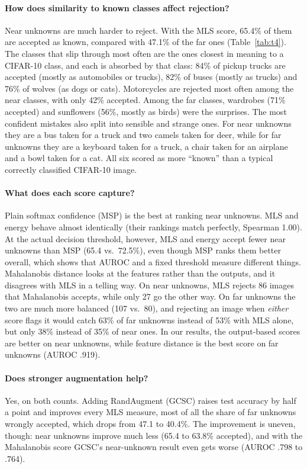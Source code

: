 \documentclass{article}
\begin{document}
\paragraph{How does similarity to known classes affect rejection?} Near unknowns are much harder to reject. With the MLS score, 65.4\% of them are accepted as known, compared with 47.1\% of the far ones (Table~\ref{tab:t4}). The classes that slip through most often are the ones closest in meaning to a CIFAR-10 class, and each is absorbed by that class: 84\% of pickup trucks are accepted (mostly as automobiles or trucks), 82\% of buses (mostly as trucks) and 76\% of wolves (as dogs or cats). Motorcycles are rejected most often among the near classes, with only 42\% accepted. Among the far classes, wardrobes (71\% accepted) and sunflowers (56\%, mostly as birds) were the surprises. The most confident mistakes also split into sensible and strange ones. For near unknowns they are a bus taken for a truck and two camels taken for deer, while for far unknowns they are a keyboard taken for a truck, a chair taken for an airplane and a bowl taken for a cat. All six scored as more ``known'' than a typical correctly classified CIFAR-10 image.

\paragraph{What does each score capture?} Plain softmax confidence (MSP) is the best at ranking near unknowns. MLS and energy behave almost identically (their rankings match perfectly, Spearman 1.00). At the actual decision threshold, however, MLS and energy accept fewer near unknowns than MSP (65.4 vs.\ 72.5\%), even though MSP ranks them better overall, which shows that AUROC and a fixed threshold measure different things. Mahalanobis distance looks at the features rather than the outputs, and it disagrees with MLS in a telling way. On near unknowns, MLS rejects 86 images that Mahalanobis accepts, while only 27 go the other way. On far unknowns the two are much more balanced (107 vs.\ 80), and rejecting an image when \emph{either} score flags it would catch 63\% of far unknowns instead of 53\% with MLS alone, but only 38\% instead of 35\% of near ones. In our results, the output-based scores are better on near unknowns, while feature distance is the best score on far unknowns (AUROC .919).

\paragraph{Does stronger augmentation help?} Yes, on both counts. Adding RandAugment (GCSC) raises test accuracy by half a point and improves every MLS measure, most of all the share of far unknowns wrongly accepted, which drops from 47.1 to 40.4\%. The improvement is uneven, though: near unknowns improve much less (65.4 to 63.8\% accepted), and with the Mahalanobis score GCSC's near-unknown result even gets worse (AUROC .798 to .764).
\end{document}
